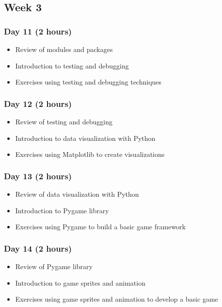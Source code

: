 \documentclass[11pt]{article}
\begin{document}
\subsection*{Week 3}
\label{sec:orgee549a0}
\subsubsection*{Day 11 (2 hours)}
\label{sec:org13e91aa}

\begin{itemize}
\item Review of modules and packages
\item Introduction to testing and debugging
\item Exercises using testing and debugging techniques
\end{itemize}
\subsubsection*{Day 12 (2 hours)}
\label{sec:orgd8a3920}

\begin{itemize}
\item Review of testing and debugging
\item Introduction to data visualization with Python
\item Exercises using Matplotlib to create visualizations
\end{itemize}

\subsubsection*{Day 13 (2 hours)}
\label{sec:org84faecb}

\begin{itemize}
\item Review of data visualization with Python
\item Introduction to Pygame library
\item Exercises using Pygame to build a basic game framework
\end{itemize}
\subsubsection*{Day 14 (2 hours)}
\label{sec:orgf613e51}

\begin{itemize}
\item Review of Pygame library
\item Introduction to game sprites and animation
\item Exercises using game sprites and animation to develop a basic game
\end{itemize}
\end{document}
